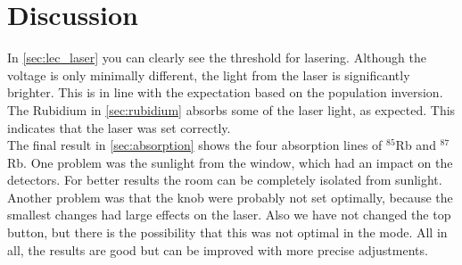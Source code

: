 \section{Discussion}
\label{sec:Diskussion}
In \autoref{sec:lec_laser} you can clearly see the threshold for lasering.
Although the voltage is only minimally different, the light from the laser is significantly brighter.
This is in line with the expectation based on the population inversion.
\\
The Rubidium in \autoref{sec:rubidium} absorbs some of the laser light, as expected.
This indicates that the laser was set correctly.
\\
The final result in \autoref{sec:absorption} shows the four absorption lines of $^{85}$Rb and $^{87}$Rb.
One problem was the sunlight from the window, which had an impact on the detectors.
For better results the room can be completely isolated from sunlight.
\\
Another problem was that the knob were probably not set optimally, because the smallest changes had large effects on the laser.
Also we have not changed the top button, but there is the possibility that this was not optimal in the mode.
All in all, the results are good but can be improved with more precise adjustments.
